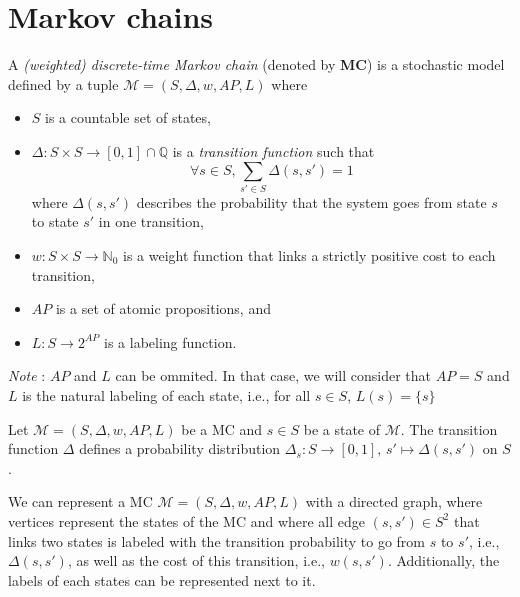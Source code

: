 \section{Markov chains}
\begin{definition}
  A \textit{(weighted) discrete-time Markov chain} (denoted by \textbf{MC}) is a stochastic model defined by a tuple $\mathcal{M}=(S, \Delta, w, AP, L)$ where
	\begin{itemize}
		\item $S$ is a countable set of states,
		\item $\Delta: S \times S \rightarrow [0,1] \cap \mathbb{Q}$ is a  \textit{transition function} such that \[\forall s \in S, \sum_{s' \in S}\Delta(s, s')= 1\]
		where $\Delta(s, s')$ describes the probability that the system goes from state $s$ to state $s'$ in one transition,
    \item $w : S \times S \rightarrow \mathbb{N}_0$ %
      is a weight function that links a strictly positive cost to each transition,
    \item $AP$ is a set of atomic propositions, and
    \item $L : S \rightarrow 2^{AP}$ is a labeling function.
	\end{itemize}
  \textit{Note }: $AP$ and $L$ can be ommited. In that case, we will consider that $AP = S$ and $L$ is the natural labeling of each state, i.e., for all $s \in S$, $L(s) = \{s\}$
\end{definition}

\begin{property}
  Let $\mathcal{M} = (S, \Delta, w, AP, L)$ be a MC and $s \in S$ be a state of $\mathcal{M}$. The transition function $\Delta$ defines a probability distribution $\Delta_s : S \rightarrow [0, 1], \, s' \mapsto \Delta(s, s')$ on $S$.
\end{property}

We can represent a MC $\mathcal{M} = (S, \Delta, w, AP, L)$ with a directed graph, where vertices represent the states
of the MC and where all edge $(s, s') \in S^2$ that links two states is labeled with the transition probability to go from $s$ to $s'$, i.e., $\Delta(s, s')$, as well as the cost of this transition, i.e., $w(s, s')$. Additionally, the labels of each
states can be represented next to it.

